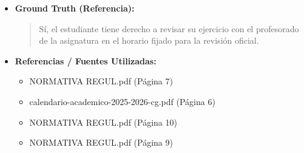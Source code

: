 \documentclass[12pt,a4paper,oneside]{report}
\begin{document}
\begin{itemize}
\begin{itemize}
\begin{quote}
Por lo tanto, tienes derecho a revisar tu examen con el profesor antes de que se firmen las actas, dentro del plazo establecido en la normativa. Es importante que consultes con el profesor responsable de la asignatura para conocer el horario y lugar de la revisión.

Es recomendable que consultes también el artículo 27 de la Normativa Reguladora de la Evaluación y Calificación de las Asignaturas, que establece que las calificaciones definitivas se harán públicas dentro de los diez días hábiles siguientes a la revisión de las calificaciones provisionales.

Recuerda que las actas deben ser firmadas y depositadas en las Secretarías de los Centros dentro de los plazos previstos en el calendario académico, según el artículo 30 de la Normativa Reguladora de la Evaluación y Calificación de las Asignaturas.
                \end{quote}
          \item \textbf{{Ground Truth (Referencia):}} \\
                \begin{quote}
Sí, el estudiante tiene derecho a revisar su ejercicio con el profesorado de la asignatura en el horario fijado para la revisión oficial.
                \end{quote}
          \item \textbf{{Referencias / Fuentes Utilizadas:}} \\
                \begin{itemize}
                  \item NORMATIVA REGUL.pdf (Página 7)
                  \item calendario-academico-2025-2026-cg.pdf (Página 6)
                  \item NORMATIVA REGUL.pdf (Página 10)
                  \item NORMATIVA REGUL.pdf (Página 9)
                \end{itemize}
        \end{itemize}


\end{itemize}
\end{document}
